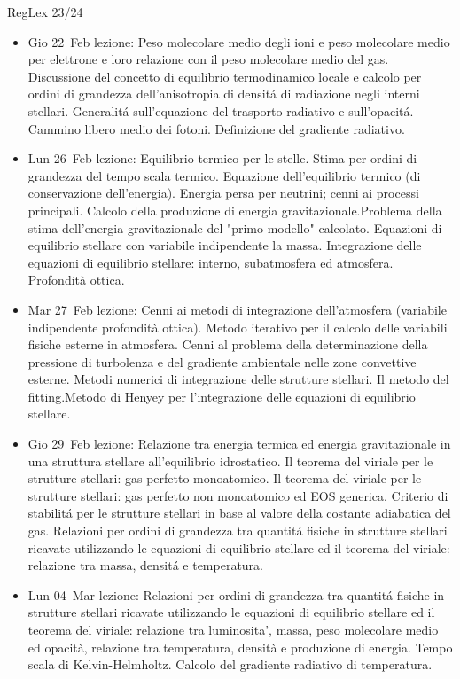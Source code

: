 \begin{frame}[allowframebreaks]{RegLex 23/24}
\begin{itemize}
\item Gio 22 Feb lezione: Peso molecolare medio degli ioni e peso molecolare medio per elettrone e loro relazione con il peso molecolare medio del gas. Discussione del concetto di equilibrio termodinamico locale e calcolo per ordini di grandezza dell'anisotropia di densit\'a di radiazione negli interni stellari. Generalit\'a sull'equazione del trasporto radiativo e sull'opacit\'a. Cammino libero medio dei fotoni. Definizione del gradiente radiativo. 
\item Lun 26 Feb lezione: Equilibrio termico per le stelle. Stima per ordini di grandezza del tempo scala termico. Equazione dell'equilibrio termico (di conservazione dell'energia). Energia persa per neutrini; cenni ai processi principali. Calcolo della produzione di energia gravitazionale.Problema della stima dell'energia gravitazionale del "primo modello" calcolato. Equazioni di equilibrio stellare con variabile indipendente la massa. Integrazione delle equazioni di equilibrio stellare: interno, subatmosfera ed atmosfera. Profondità ottica. 
\item Mar 27 Feb lezione: Cenni ai metodi di integrazione dell'atmosfera (variabile indipendente profondità ottica). Metodo iterativo per il calcolo delle variabili fisiche esterne in atmosfera. Cenni al problema della determinazione della pressione di turbolenza e del gradiente ambientale nelle zone convettive esterne. Metodi numerici di integrazione delle strutture stellari. Il metodo del fitting.Metodo di Henyey per l'integrazione delle equazioni di equilibrio stellare. 
\item Gio 29 Feb lezione: Relazione tra energia termica ed energia gravitazionale in una struttura stellare all'equilibrio idrostatico. Il teorema del viriale per le strutture stellari: gas perfetto monoatomico. Il teorema del viriale per le strutture stellari: gas perfetto non monoatomico ed EOS generica. Criterio di stabilit\'a per le strutture stellari in base al valore della costante adiabatica del gas. Relazioni per ordini di grandezza tra quantit\'a fisiche in strutture stellari ricavate utilizzando le equazioni di equilibrio stellare ed il teorema del viriale: relazione tra massa, densit\'a e temperatura. 
\item Lun 04 Mar lezione: Relazioni per ordini di grandezza tra quantit\'a fisiche in strutture stellari ricavate utilizzando le equazioni di equilibrio stellare ed il teorema del viriale: relazione tra luminosita', massa, peso molecolare medio ed opacità, relazione tra temperatura, densità e produzione di energia. Tempo scala di Kelvin-Helmholtz. Calcolo del gradiente radiativo di temperatura. 

\end{itemize}
\end{frame}
